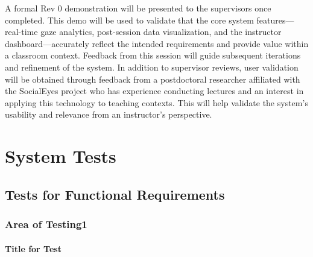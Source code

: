 \documentclass[12pt, titlepage]{article}
\begin{document}
A formal Rev 0 demonstration will be presented to the supervisors once completed. This demo will be used to validate that the core system features—real-time gaze analytics, post-session data visualization, and the instructor dashboard—accurately reflect the intended requirements and provide value within a classroom context. Feedback from this session will guide subsequent iterations and refinement of the system.
In addition to supervisor reviews, user validation will be obtained through feedback from a postdoctoral researcher affiliated with the SocialEyes project who has experience conducting lectures and an interest in applying this technology to teaching contexts. This will help validate the system’s usability and relevance from an instructor’s perspective.
\newline


\section{System Tests}


\subsection{Tests for Functional Requirements}



\subsubsection{Area of Testing1}

		
\paragraph{Title for Test}
\end{document}
